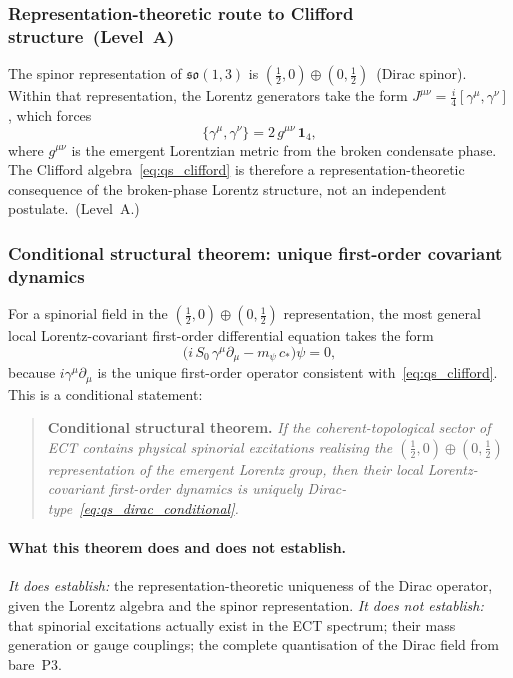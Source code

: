 \subsubsection*{Representation-theoretic route to Clifford structure~(Level~A)}

The spinor representation of $\mathfrak{so}(1,3)$ is
$(\tfrac{1}{2},0)\oplus(0,\tfrac{1}{2})$~(Dirac spinor).
Within that representation, the Lorentz generators take the form
$J^{\mu\nu}=\frac{i}{4}[\gamma^\mu,\gamma^\nu]$, which forces
\begin{equation}
  \label{eq:qs_clifford}
  \bigl\{\gamma^\mu,\gamma^\nu\bigr\}
  = 2\,g^{\mu\nu}\,\mathbf{1}_4,
\end{equation}
where $g^{\mu\nu}$ is the emergent Lorentzian metric from the broken
condensate phase.
The Clifford algebra~\eqref{eq:qs_clifford} is therefore a
representation-theoretic consequence of the broken-phase Lorentz
structure, not an independent postulate.~(Level~A.)

\subsubsection*{Conditional structural theorem: unique first-order covariant dynamics}

For a spinorial field in the $(\tfrac{1}{2},0)\oplus(0,\tfrac{1}{2})$
representation, the most general local Lorentz-covariant first-order
differential equation takes the form
\begin{equation}
  \label{eq:qs_dirac_conditional}
  \bigl(i\,S_0\,\gamma^\mu\partial_\mu - m_\psi\,c_*\bigr)\psi = 0,
\end{equation}
because $i\gamma^\mu\partial_\mu$ is the unique first-order operator
consistent with~\eqref{eq:qs_clifford}.
This is a conditional statement:
\begin{quote}
\textbf{Conditional structural theorem.}
\textit{If the coherent-topological sector of ECT contains physical
spinorial excitations realising the
$(\frac{1}{2},0)\oplus(0,\frac{1}{2})$ representation of the
emergent Lorentz group, then their local Lorentz-covariant
first-order dynamics is uniquely Dirac-type~\eqref{eq:qs_dirac_conditional}.}
\end{quote}

\paragraph{What this theorem does and does not establish.}
\textit{It does establish:} the representation-theoretic uniqueness
of the Dirac operator, given the Lorentz algebra and the spinor
representation.
\textit{It does not establish:} that spinorial excitations actually
exist in the ECT spectrum; their mass generation or gauge couplings;
the complete quantisation of the Dirac field from bare~P3.

